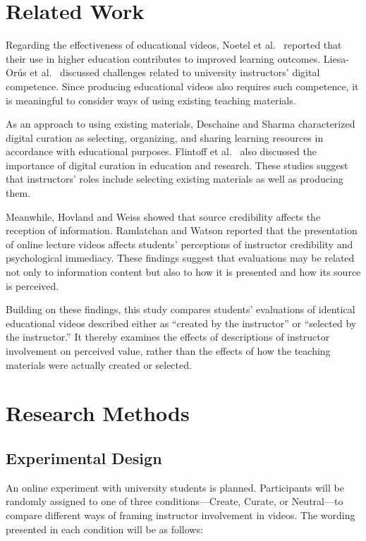 \documentclass[11pt]{ltjarticle}
\begin{document}
\section{Related Work}

Regarding the effectiveness of educational videos, Noetel et al.\ \cite{noetel2021} reported that their use in higher education contributes to improved learning outcomes. Liesa-Or\'us et al.\ \cite{liesa2023} discussed challenges related to university instructors' digital competence. Since producing educational videos also requires such competence, it is meaningful to consider ways of using existing teaching materials.

As an approach to using existing materials, Deschaine and Sharma \cite{deschaine2015} characterized digital curation as selecting, organizing, and sharing learning resources in accordance with educational purposes. Flintoff et al.\ \cite{flintoff2014} also discussed the importance of digital curation in education and research. These studies suggest that instructors' roles include selecting existing materials as well as producing them.

Meanwhile, Hovland and Weiss \cite{hovland1951} showed that source credibility affects the reception of information. Ramlatchan and Watson \cite{ramlatchan2020} reported that the presentation of online lecture videos affects students' perceptions of instructor credibility and psychological immediacy. These findings suggest that evaluations may be related not only to information content but also to how it is presented and how its source is perceived.

Building on these findings, this study compares students' evaluations of identical educational videos described either as ``created by the instructor'' or ``selected by the instructor.'' It thereby examines the effects of descriptions of instructor involvement on perceived value, rather than the effects of how the teaching materials were actually created or selected.

\section{Research Methods}

\subsection{Experimental Design}

An online experiment with university students is planned. Participants will be randomly assigned to one of three conditions---Create, Curate, or Neutral---to compare different ways of framing instructor involvement in videos. The wording presented in each condition will be as follows:
\end{document}
